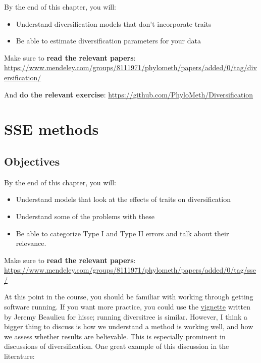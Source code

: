 \documentclass[]{article}
\providecommand{\tightlist}{%
  \setlength{\itemsep}{0pt}\setlength{\parskip}{0pt}}
\begin{document}
By the end of this chapter, you will:

\begin{itemize}
\tightlist
\item
  Understand diversification models that don't incorporate traits
\item
  Be able to estimate diversification parameters for your data
\end{itemize}

Make sure to \textbf{read the relevant papers}: \url{https://www.mendeley.com/groups/8111971/phylometh/papers/added/0/tag/diversification/}

And \textbf{do the relevant exercise}:
\url{https://github.com/PhyloMeth/Diversification}

\hypertarget{sse-methods}{%
\section{SSE methods}\label{sse-methods}}

\hypertarget{objectives-5}{%
\subsection{Objectives}\label{objectives-5}}

By the end of this chapter, you will:

\begin{itemize}
\tightlist
\item
  Understand models that look at the effects of traits on diversification
\item
  Understand some of the problems with these
\item
  Be able to categorize Type I and Type II errors and talk about their relevance.
\end{itemize}

Make sure to \textbf{read the relevant papers}: \url{https://www.mendeley.com/groups/8111971/phylometh/papers/added/0/tag/sse/}

At this point in the course, you should be familiar with working through getting software running. If you want more practice, you could use the \href{https://cran.r-project.org/web/packages/hisse/vignettes/hisse-vignette.html}{vignette} written by Jeremy Beaulieu for hisse; running diversitree is similar. However, I think a bigger thing to discuss is how we understand a method is working well, and how we assess whether results are believable. This is especially prominent in discussions of diversification. One great example of this discussion in the literature:
\end{document}
